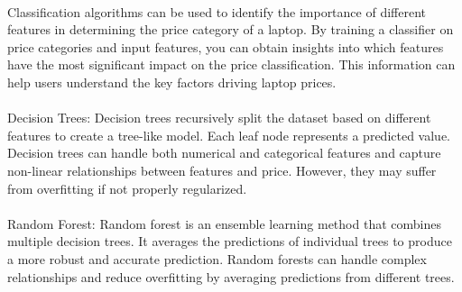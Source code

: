 \paragraph{}
Classification algorithms can be used to identify the importance of different features in determining the price category of a laptop. By training a classifier on price categories and input features, you can obtain insights into which features have the most significant impact on the price classification. This information can help users understand the key factors driving laptop prices.
\paragraph{}
Decision Trees: Decision trees recursively split the dataset based on different features to create a tree-like model. Each leaf node represents a predicted value. Decision trees can handle both numerical and categorical features and capture non-linear relationships between features and price. However, they may suffer from overfitting if not properly regularized.
\paragraph{}
Random Forest: Random forest is an ensemble learning method that combines multiple decision trees. It averages the predictions of individual trees to produce a more robust and accurate prediction. Random forests can handle complex relationships and reduce overfitting by averaging predictions from different trees.
